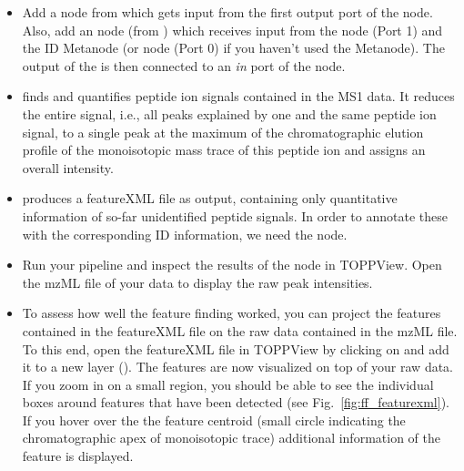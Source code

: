 \begin{itemize}
\item
Add a  node from  which gets input from the first output port of the  node. Also, add an  node (from ) which receives input from the  node (Port 1) and the ID Metanode (or  node (Port 0) if you haven't used the Metanode).
The output of the  is then connected to an \textit{in} port of the  node.
\item
{} finds and quantifies peptide ion signals contained in the MS1 data.
It reduces the entire signal, i.e., all peaks explained by one and the same peptide ion signal, to a single peak at the maximum of the chromatographic elution profile of the monoisotopic mass trace of this peptide ion and assigns an overall intensity.
\item
{} produces a featureXML file as output, containing only quantitative information of so-far unidentified peptide signals.
In order to annotate these with the corresponding ID information, we need the  node.
\item Run your pipeline and inspect the results of the  node in TOPPView. Open the mzML file of your data to display the raw peak intensities.
\item To assess how well the feature finding worked, you can project the features contained in the featureXML file on the raw data contained in the mzML file. To this end, open the featureXML file in TOPPView by clicking on  and add it to a new layer (). The features are now visualized on top of your raw data. If you zoom in on a small region, you should be able to see the individual boxes around features that have been detected (see Fig.~\ref{fig:ff_featurexml}). If you hover over the the feature centroid (small circle indicating the chromatographic apex of monoisotopic trace) additional information of the feature is displayed.


\end{itemize}
